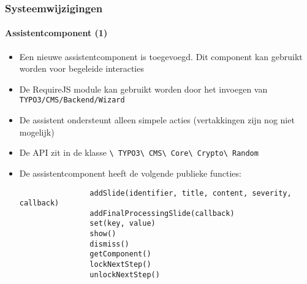 \begin{frame}[fragile]
	\frametitle{Systeemwijzigingen}
	\framesubtitle{Assistentcomponent (1)}

	\lstset{basicstyle=\tiny\ttfamily}

	\begin{itemize}

		\item Een nieuwe assistentcomponent is toegevoegd. Dit component kan gebruikt worden voor begeleide interacties

		\item De RequireJS module kan gebruikt worden door het invoegen van \texttt{TYPO3/CMS/Backend/Wizard}

		\item De assistent ondersteunt alleen simpele acties\newline
			(vertakkingen zijn nog niet mogelijk)

		\item De API zit in de klasse
			\texttt{\textbackslash
				TYPO3\textbackslash
				CMS\textbackslash
				Core\textbackslash
				Crypto\textbackslash
				Random}

		\item De assistentcomponent heeft de volgende publieke functies:

			\begin{lstlisting}
				addSlide(identifier, title, content, severity, callback)
				addFinalProcessingSlide(callback)
				set(key, value)
				show()
				dismiss()
				getComponent()
				lockNextStep()
				unlockNextStep()
			\end{lstlisting}

	\end{itemize}

\end{frame}

